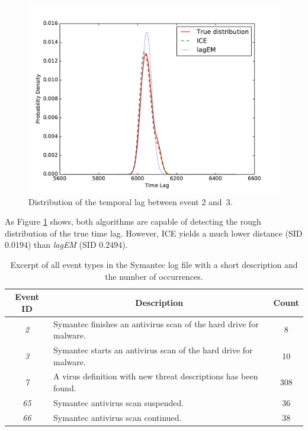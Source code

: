 \documentclass[conference]{IEEEtran}
\theoremstyle{examplestyle}
\begin{document}
\begin{figure}[!tb]
	\centering
	\includegraphics[scale=0.4]{images/symantec/2-3.pdf}
	\caption{Distribution of the temporal lag between event 2 and~3.}
	\label{fig:2-3}
\end{figure}

As Figure \ref{fig:2-3} shows, both algorithms are capable of detecting the rough distribution of the true time lag. However, \ac{ICE} yields a much lower distance (\ac{SID} $0.0194$) than \textit{lagEM} (\ac{SID} $0.2494$).


\begin{table}[!ht]
	\caption{Excerpt of all event types in the Symantec log file with a short description and the number of occurrences.}
	\label{tbl:symantecEvents}

	\centering
	\begin{tabular}{c p{} c}
		\textbf{Event ID} & \multicolumn{1}{c}{\textbf{Description}} & \textbf{Count} \\
		\hline
		\textit{2}	& Symantec finishes an antivirus scan of the hard drive for malware. & 8 \\
		\textit{3}	& Symantec starts an antivirus scan of the hard drive for malware. & 10 \\
		\textit{7}	& A virus definition with new threat descriptions has been found. & 308 \\
		\textit{65}	& Symantec antivirus scan suspended. & 36 \\
		\textit{66}	& Symantec antivirus scan continued. & 38 \\
	\end{tabular}

\end{table}
\end{document}
